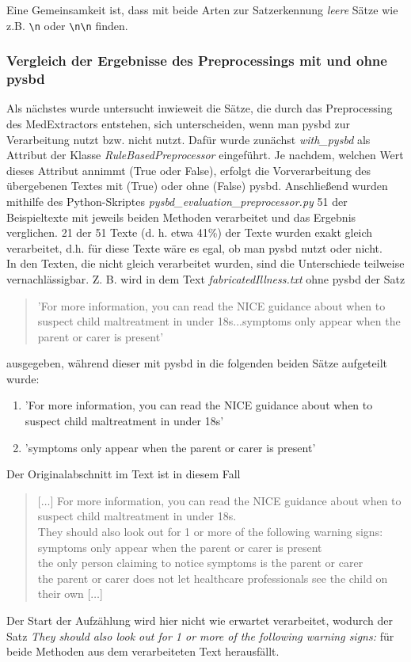 Eine Gemeinsamkeit ist, dass mit beide Arten zur Satzerkennung \emph{leere} Sätze wie z.B. \verb!\n! oder \verb!\n!\verb!\n! finden.

\subsubsection{Vergleich der Ergebnisse des Preprocessings mit und ohne pysbd}

Als nächstes wurde untersucht inwieweit die Sätze, die durch das Preprocessing des MedExtractors entstehen, sich unterscheiden, wenn man pysbd zur Verarbeitung nutzt bzw. nicht nutzt.
Dafür wurde zunächst \emph{with\_pysbd} als Attribut der Klasse \emph{RuleBasedPreprocessor} eingeführt. Je nachdem, welchen Wert dieses Attribut annimmt (True oder False), erfolgt die Vorverarbeitung des übergebenen Textes mit (True) oder ohne (False) pysbd. Anschließend wurden mithilfe des Python-Skriptes \emph{pysbd\_evaluation\_preprocessor.py} 51 der Beispieltexte mit jeweils beiden Methoden verarbeitet und das Ergebnis verglichen. 21 der 51 Texte (d. h. etwa 41\%) der Texte wurden exakt gleich verarbeitet, d.h. für diese Texte wäre es egal, ob man pysbd nutzt oder nicht.\\
In den Texten, die nicht gleich verarbeitet wurden, sind die Unterschiede teilweise vernachlässigbar. Z. B. wird in dem Text \emph{fabricatedIllness.txt} ohne pysbd der Satz 
\begin{quotation}
	'For more information, you can read the NICE guidance about when to suspect child maltreatment in under 18s...symptoms only appear when the parent or carer is present'
\end{quotation}
ausgegeben, während dieser mit pysbd in die folgenden beiden Sätze aufgeteilt wurde:
\begin{enumerate}
	\item 'For more information, you can read the NICE guidance about when to suspect child maltreatment in under 18s'
	\item 'symptoms only appear when the parent or carer is present'
\end{enumerate}
Der Originalabschnitt im Text ist in diesem Fall
\begin{quotation}
	[$\dots$]
	For more information, you can read the NICE guidance about when to suspect child maltreatment in under 18s.\\
	
	They should also look out for 1 or more of the following warning signs:\\
	
	symptoms only appear when the parent or carer is present\\
	the only person claiming to notice symptoms is the parent or carer\\
	the parent or carer does not let healthcare professionals see the child on their own
	[$\dots$]
\end{quotation}
Der Start der Aufzählung wird hier nicht wie erwartet verarbeitet, wodurch der Satz \emph{They should also look out for 1 or more of the following warning signs:} für beide Methoden aus dem verarbeiteten Text herausfällt.\\

